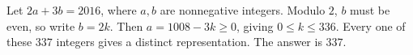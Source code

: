 Let $2a+3b=2016$, where $a,b$ are nonnegative integers. Modulo $2$, $b$ must be even, so write $b=2k$. Then $a=1008-3k\ge0$, giving $0\le k\le336$. Every one of these $337$ integers gives a distinct representation. The answer is $\boxed{337}$.
